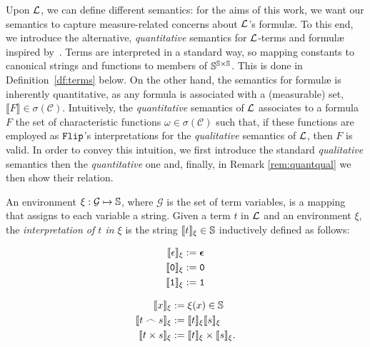 Upon $\mathcal{L}$, we can define different semantics: for the aims of this work,
we want our semantics to capture measure-related concerns about $\mathcal{L}$'s
formul\ae{}. To this end,
we introduce the alternative,
\emph{quantitative}
semantics for $\mathcal{L}$-terms and formul\ae{} inspired by~\cite{ADLP21}.
Terms are interpreted in
a standard way, so mapping constants to canonical strings and
functions to members of $\mathbb{S}^{\mathbb{S}\times \mathbb{S}}$.
This is done in Definition~\ref{df:terms} below.
On the other hand, the semantics for formul\ae{}
is inherently
quantitative,
as any formula is associated with a (measurable)
set, $\llbracket F\rrbracket \in \sigma(\mathscr{C})$.
%
Intuitively, the \emph{quantitative} semantics of $\mathcal{L}$ associates to
a formula $F$ the set of characteristic functions $\omega \in \sigma(\mathscr{C})$
such that, if these functions are employed as $\mathtt{Flip}$'s interpretations for
the \emph{qualitative}
semantics of $\mathcal{L}$, then $F$ is valid. In order to convey this intuition,
we first introduce the standard \emph{qualitative} semantics then
the \emph{quantitative} one and, finally, in Remark \ref{rem:quantqual} we then show their relation.






\begin{defn}\label{df:terms}
An environment $\xi:\mathcal{G}\mapsto \mathbb{S}$,
where $\mathcal{G}$ is the set of term variables,
is a mapping that assigns to each variable
a string.
Given a term $t$ in $\mathcal{L}$ and an environment
$\xi$,
the \emph{interpretation of $t$ in $\xi$}
is the string $\llbracket t\rrbracket_\xi \in \mathbb{S}$
inductively defined as follows:

\begin{minipage}{\linewidth}
\begin{minipage}[t]{0.4\linewidth}
\begin{align*}
\llbracket \epsilon\rrbracket_\xi &:=\bm{\epsilon} \\
\llbracket \mathtt{0}\rrbracket_\xi &:=\mathtt{0} \\
\llbracket \mathtt{1} \rrbracket_\xi &:=\mathtt{1}
\end{align*}
\end{minipage}
\hfill
\begin{minipage}[t]{0.6\linewidth}
\begin{align*}
\llbracket x\rrbracket_\xi &:= \xi(x) \in \mathbb{S} \\
\llbracket t\frown s\rrbracket_\xi &:=\llbracket t\rrbracket_\xi
 \llbracket s\rrbracket_\xi \\
\llbracket t\times s\rrbracket_\xi &:=\llbracket t\rrbracket_\xi
\times \llbracket s\rrbracket_\xi.
\end{align*}
\end{minipage}
\end{minipage}
\end{defn}

